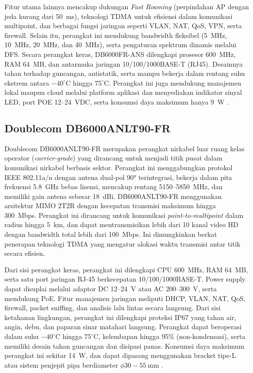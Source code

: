 Fitur utama lainnya mencakup dukungan \emph{Fast Roaming} (perpindahan AP dengan jeda kurang dari 50~ms), teknologi TDMA untuk efisiensi dalam komunikasi multipoint, dan berbagai fungsi jaringan seperti VLAN, NAT, QoS, VPN, serta firewall. Selain itu, perangkat ini mendukung bandwidth fleksibel (5~MHz, 10~MHz, 20~MHz, dan 40~MHz), serta pengaturan spektrum dinamis melalui DFS. Secara perangkat keras, DB6000FR-ANS dilengkapi prosesor 600~MHz, RAM 64~MB, dan antarmuka jaringan 10/100/1000BASE-T (RJ45). Desainnya tahan terhadap guncangan, antistatik, serta mampu bekerja dalam rentang suhu ekstrem antara \(-40^\circ\text{C}\) hingga \(75^\circ\text{C}\). Perangkat ini juga mendukung manajemen lokal maupun cloud melalui platform aplikasi dan menyediakan indikator sinyal LED, port POE 12--24~VDC, serta konsumsi daya maksimum hanya 9~W \cite{doublecom_db6000frans}.

\subsection{Doublecom DB6000ANLT90-FR}
Doublecom DB6000ANLT90-FR merupakan perangkat nirkabel luar ruang kelas operator (\emph{carrier-grade}) yang dirancang untuk menjadi titik pusat dalam komunikasi nirkabel berbasis sektor. Perangkat ini menggabungkan protokol IEEE 802.11a/n dengan antena dual-pol 90° terintegrasi, bekerja dalam pita frekuensi 5.8~GHz bebas lisensi, mencakup rentang 5150--5850~MHz, dan memiliki gain antena sebesar 18~dBi. DB6000ANLT90-FR menggunakan arsitektur MIMO 2T2R dengan kecepatan transmisi maksimum hingga 300~Mbps. Perangkat ini dirancang untuk komunikasi \emph{point-to-multipoint} dalam radius hingga 5~km, dan dapat mentransmisikan lebih dari 10 kanal video HD dengan bandwidth total lebih dari 100~Mbps. Ini dimungkinkan berkat penerapan teknologi TDMA yang mengatur alokasi waktu transmisi antar titik secara efisien.

Dari sisi perangkat keras, perangkat ini dilengkapi CPU 600~MHz, RAM 64~MB, serta satu port jaringan RJ-45 berkecepatan 10/100/1000BASE-T. Power supply dapat disuplai melalui adaptor DC 12--24~V atau AC 200--300~V, serta mendukung PoE. Fitur manajemen jaringan meliputi DHCP, VLAN, NAT, QoS, firewall, packet sniffing, dan analisis lalu lintas secara langsung. Dari sisi ketahanan lingkungan, perangkat ini dilengkapi proteksi IP67 yang tahan air, angin, debu, dan paparan sinar matahari langsung. Perangkat dapat beroperasi dalam suhu \(-40^\circ\text{C}\) hingga \(75^\circ\text{C}\), kelembapan hingga 95\% (non-kondensasi), serta memiliki desain tahan guncangan dan disipasi panas. Konsumsi daya maksimum perangkat ini sekitar 14~W, dan dapat dipasang menggunakan bracket tipe-L atau sistem penjepit pipa berdiameter \(\phi 30{-}55~\text{mm}\) \cite{doublecom_db6000anlt90}.

